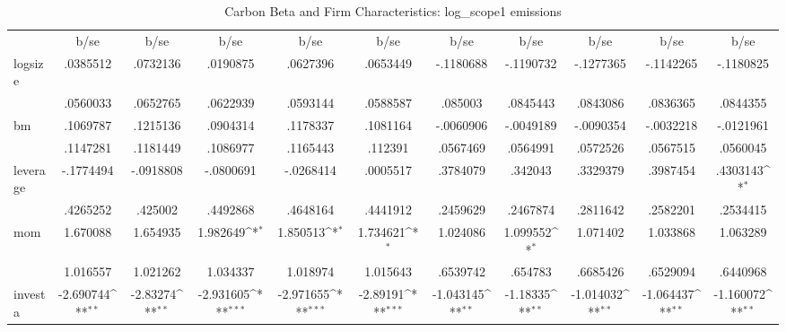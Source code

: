 \begin{table}[htbp]\centering
\def\sym#1{\ifmmode^{#1}\else\(^{#1}\)\fi}
\caption{Carbon Beta and Firm Characteristics: log\_scope1 emissions}
\begin{tabular}{l*{10}{c}}
                &     b/se         &     b/se         &     b/se         &     b/se         &     b/se         &     b/se         &     b/se         &     b/se         &     b/se         &     b/se         \\
logsize         & .0385512         & .0732136         & .0190875         & .0627396         & .0653449         &-.1180688         &-.1190732         &-.1277365         &-.1142265         &-.1180825         \\
                & .0560033         & .0652765         & .0622939         & .0593144         & .0588587         &  .085003         & .0845443         & .0843086         & .0836365         & .0844355         \\
bm              & .1069787         & .1215136         & .0904314         & .1178337         & .1081164         &-.0060906         &-.0049189         &-.0090354         &-.0032218         &-.0121961         \\
                & .1147281         & .1181449         & .1086977         & .1165443         &  .112391         & .0567469         & .0564991         & .0572526         & .0567515         & .0560045         \\
leverage        &-.1774494         &-.0918808         &-.0800691         &-.0268414         & .0005517         & .3784079         &  .342043         & .3329379         & .3987454         & .4303143\sym{*}  \\
                & .4265252         &  .425002         & .4492868         & .4648164         & .4441912         & .2459629         & .2467874         & .2811642         & .2582201         & .2534415         \\
mom             & 1.670088         & 1.654935         & 1.982649\sym{*}  & 1.850513\sym{*}  & 1.734621\sym{*}  & 1.024086         & 1.099552\sym{*}  & 1.071402         & 1.033868         & 1.063289         \\
                & 1.016557         & 1.021262         & 1.034337         & 1.018974         & 1.015643         & .6539742         &  .654783         & .6685426         & .6529094         & .6440968         \\
investa         &-2.690744\sym{**} & -2.83274\sym{**} &-2.931605\sym{***}&-2.971655\sym{***}& -2.89191\sym{***}&-1.043145\sym{**} & -1.18335\sym{**} &-1.014032\sym{**} &-1.064437\sym{**} &-1.160072\sym{**} \\

\end{tabular}
\end{table}
